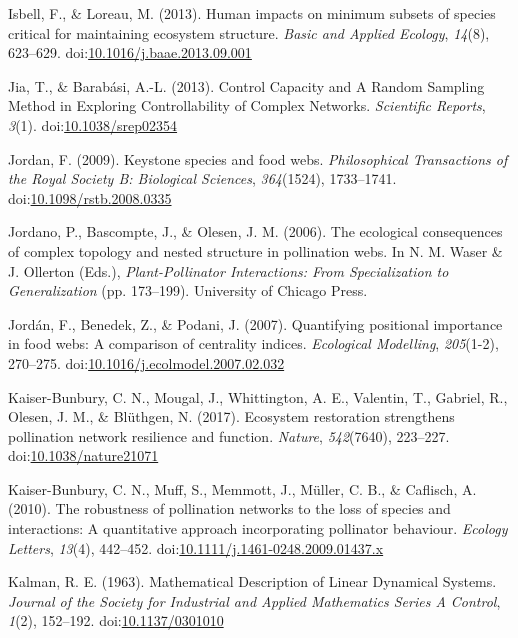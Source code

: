 \documentclass[a4paper]{artikel1}
\theoremstyle{definition}
\theoremstyle{definition}
\theoremstyle{definition}
\theoremstyle{remark}
\begin{document}
\hypertarget{ref-isbell_human_2013}{}
Isbell, F., \& Loreau, M. (2013). Human impacts on minimum subsets of
species critical for maintaining ecosystem structure. \emph{Basic and
Applied Ecology}, \emph{14}(8), 623--629.
doi:\href{https://doi.org/10.1016/j.baae.2013.09.001}{10.1016/j.baae.2013.09.001}

\hypertarget{ref-jia_control_2013}{}
Jia, T., \& Barabási, A.-L. (2013). Control Capacity and A Random
Sampling Method in Exploring Controllability of Complex Networks.
\emph{Scientific Reports}, \emph{3}(1).
doi:\href{https://doi.org/10.1038/srep02354}{10.1038/srep02354}

\hypertarget{ref-jordan_keystone_2009}{}
Jordan, F. (2009). Keystone species and food webs. \emph{Philosophical
Transactions of the Royal Society B: Biological Sciences},
\emph{364}(1524), 1733--1741.
doi:\href{https://doi.org/10.1098/rstb.2008.0335}{10.1098/rstb.2008.0335}

\hypertarget{ref-jordano_ecological_2006}{}
Jordano, P., Bascompte, J., \& Olesen, J. M. (2006). The ecological
consequences of complex topology and nested structure in pollination
webs. In N. M. Waser \& J. Ollerton (Eds.), \emph{Plant-Pollinator
Interactions: From Specialization to Generalization} (pp. 173--199).
University of Chicago Press.

\hypertarget{ref-jordan_quantifying_2007}{}
Jordán, F., Benedek, Z., \& Podani, J. (2007). Quantifying positional
importance in food webs: A comparison of centrality indices.
\emph{Ecological Modelling}, \emph{205}(1-2), 270--275.
doi:\href{https://doi.org/10.1016/j.ecolmodel.2007.02.032}{10.1016/j.ecolmodel.2007.02.032}

\hypertarget{ref-kaiser-bunbury_ecosystem_2017}{}
Kaiser-Bunbury, C. N., Mougal, J., Whittington, A. E., Valentin, T.,
Gabriel, R., Olesen, J. M., \& Blüthgen, N. (2017). Ecosystem
restoration strengthens pollination network resilience and function.
\emph{Nature}, \emph{542}(7640), 223--227.
doi:\href{https://doi.org/10.1038/nature21071}{10.1038/nature21071}

\hypertarget{ref-kaiser-bunbury_robustness_2010}{}
Kaiser-Bunbury, C. N., Muff, S., Memmott, J., Müller, C. B., \&
Caflisch, A. (2010). The robustness of pollination networks to the loss
of species and interactions: A quantitative approach incorporating
pollinator behaviour. \emph{Ecology Letters}, \emph{13}(4), 442--452.
doi:\href{https://doi.org/10.1111/j.1461-0248.2009.01437.x}{10.1111/j.1461-0248.2009.01437.x}

\hypertarget{ref-kalman_mathematical_1963}{}
Kalman, R. E. (1963). Mathematical Description of Linear Dynamical
Systems. \emph{Journal of the Society for Industrial and Applied
Mathematics Series A Control}, \emph{1}(2), 152--192.
doi:\href{https://doi.org/10.1137/0301010}{10.1137/0301010}
\end{document}
